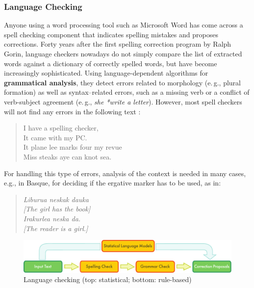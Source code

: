 \begin{multicols}{2}
\subsubsection{Language Checking}
    Anyone using a word processing tool such as Microsoft Word has come across a 
spell checking component that indicates spelling mistakes and proposes corrections. Forty years after the first spelling correction program by Ralph Gorin, language checkers nowadays do not simply compare the list of extracted words against a dictionary of correctly spelled words, but have become increasingly sophisticated. 
Using language-dependent algorithms for \textbf{grammatical analysis}, they detect errors related to morphology (e.\,g., plural formation) as well as syntax–related errors, such as a missing verb or a conflict of verb-subject agreement (e.\,g., \textit{she *write a letter}). However, most spell checkers will not find any errors in the following text \cite{zar1}:
 
\begin{quote}
  I have a spelling checker,\\
  It came with my PC.\\
  It plane lee marks four my revue\\
  Miss steaks aye can knot sea.
\end{quote}

For handling this type of errors, analysis of the 
context is needed in many cases, e.g., in Basque, for deciding if the ergative marker has to be used, as in:

\begin{quote}
  \textit{Liburua neskak dauka }\\
  \textit{[The girl has the book]}\\
  \textit{Irakurlea neska da.}\\
  \textit{[The reader is a girl.] }
\end{quote}

\begin{figure}[htb]
  \center
  \includegraphics[width=\textwidth]{../_media/english/language_checking}
  \caption{Language checking (top: statistical; bottom: rule-based)}
  \label{fig:langcheckingaarch_en}
\end{figure}


\end{multicols}
